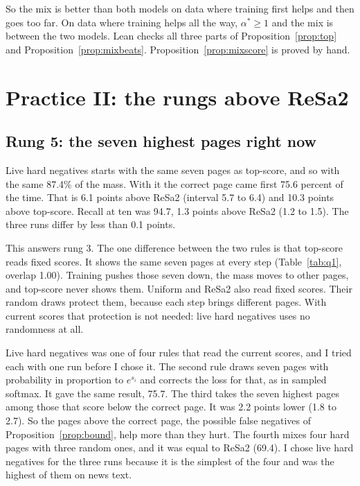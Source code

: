 \documentclass[11pt]{article}
\theoremstyle{definition}
\begin{document}
So the mix is better than both models on data where training first helps and then goes too far. On data where training helps all the way, $\alpha^{*} \ge 1$ and the mix is between the two models. Lean checks all three parts of Proposition~\ref{prop:top} and Proposition~\ref{prop:mixbeats}. Proposition~\ref{prop:mixscore} is proved by hand.

\section{Practice II: the rungs above ReSa2}
\label{sec:experiments2}

\subsection{Rung 5: the seven highest pages right now}
\label{sec:rankings}

Live hard negatives starts with the same seven pages as top-score, and so with the same 87.4\% of the mass. With it the correct page came first 75.6 percent of the time. That is 6.1 points above ReSa2 (interval 5.7 to 6.4) and 10.3 points above top-score. Recall at ten was 94.7, 1.3 points above ReSa2 (1.2 to 1.5). The three runs differ by less than 0.1 points.

This answers rung 3. The one difference between the two rules is that top-score reads fixed scores. It shows the same seven pages at every step (Table~\ref{tab:q1}, overlap 1.00). Training pushes those seven down, the mass moves to other pages, and top-score never shows them. Uniform and ReSa2 also read fixed scores. Their random draws protect them, because each step brings different pages. With current scores that protection is not needed: live hard negatives uses no randomness at all.

Live hard negatives was one of four rules that read the current scores, and I tried each with one run before I chose it. The second rule draws seven pages with probability in proportion to $e^{s_i}$ and corrects the loss for that, as in sampled softmax. It gave the same result, 75.7. The third takes the seven highest pages among those that score below the correct page. It was 2.2 points lower (1.8 to 2.7). So the pages above the correct page, the possible false negatives of Proposition~\ref{prop:bound}, help more than they hurt. The fourth mixes four hard pages with three random ones, and it was equal to ReSa2 (69.4). I chose live hard negatives for the three runs because it is the simplest of the four and was the highest of them on news text.
\end{document}
